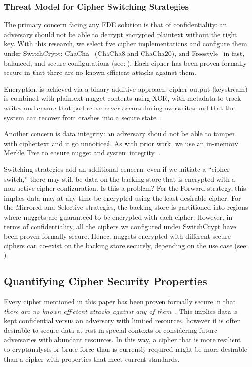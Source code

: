 \subsubsection{Threat Model for Cipher Switching Strategies}

The primary concern facing any FDE solution is that of confidentiality: an
adversary should not be able to decrypt encrypted plaintext without the right
key. With this research, we select five cipher implementations and configure
them under SwitchCrypt: ChaCha~\cite{ChaCha20} (ChaCha8 and ChaCha20), and
Freestyle~\cite{Freestyle} in fast, balanced, and secure configurations (see:
). Each cipher has been proven formally secure in that
there are no known efficient attacks against them.

Encryption is achieved via a binary additive approach: cipher output (keystream)
is combined with plaintext nugget contents using XOR, with metadata to track
writes and ensure that pad reuse never occurs during overwrites and that the
system can recover from crashes into a secure state~\cite{StrongBox}.

Another concern is data integrity: an adversary should not be able to tamper
with ciphertext and it go unnoticed. As with prior work, we use an in-memory
Merkle Tree to ensure nugget and system integrity~\cite{StrongBox}.

Switching strategies add an additional concern: even if we initiate a ``cipher
switch,'' there may still be data on the backing store that is encrypted with a
non-active cipher configuration. Is this a problem? For the Forward strategy,
this implies data may at any time be encrypted using the least desirable cipher.
For the Mirrored and Selective strategies, the backing store is partitioned into
regions where nuggets are guaranteed to be encrypted with each cipher. However,
in terms of confidentiality, all the ciphers we configured under SwitchCrypt
have been proven formally secure. Hence, nuggets encrypted with different secure
ciphers can co-exist on the backing store securely, depending on the use case
(see: ).

\subsection{Quantifying Cipher Security Properties} \label{subsec:quantify}

Every cipher mentioned in this paper has been proven formally secure in that
\emph{there are no known efficient attacks against any of them}~\cite{All,
Ciphers, Again}. This implies data is kept confidential versus an adversary with
limited resources, however it is often desirable to secure data at rest in
special contexts or considering future adversaries with abundant resources. In
this way, a cipher that is more resilient to cryptanalysis or brute-force than
is currently required might be more desirable than a cipher with properties that
meet current standards.

